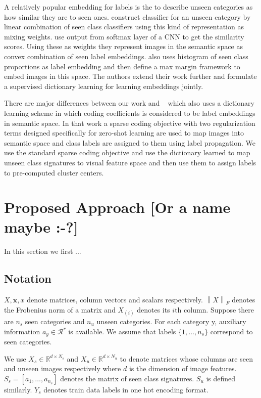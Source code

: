 \documentclass[wcp]{jmlr}
\newcommand{\norm}[1]{\left \lVert #1 \right \rVert_{F}}
\begin{document}
A relatively popular embedding for labels is the to describe unseen categories as how similar they are to seen ones.
\cite{costa} construct  classifier for an unseen category by linear combination of seen class classifiers
using this kind of representation as mixing weights. \cite{convex} use output from softmax layer of a CNN to get the similarity scores.
Using these as weights they represent images in the semantic space as convex combination of seen label embeddings.
\cite{sse} also uses histogram of seen class proportions as label embedding and then define a max margin framework to embed images
 in this space. The authors extend their work further \cite{agnostic} and formulate a supervised dictionary learning
 for learning embeddings jointly.


There are major differences between our work and  ~\cite{Kodirov2015} which also uses a dictionary learning scheme in which coding coefficients is considered to be
 label embeddings in semantic space. In that work a sparse coding objective with two regularization terms designed specifically for
 zero-shot learning are used to map images into semantic space and class labels are assigned to them using label propagation. We use
 the standard sparse coding objective and use the dictionary learned to map unseen class signatures to visual feature space and then
 use them to assign labels to pre-computed cluster centers.

\section{Proposed Approach [Or a name maybe :-?]}
In this section we first ...


\subsection{Notation}
$X, \mathbf{x}, x$ denote matrices, column vectors and scalars respectively. $\norm{X}$ denotes the Frobenius norm of a matrix and
$X_{(i)}$ denotes its $i$th column.
Suppose there are $n_s$ seen categories and $n_u$ unseen categories. For each category y,
auxiliary information $a_y \in \mathcal{R}^r$ is available. We assume that labels $\{1, \ldots, n_s \}$
correspond to seen categories.

We use $X_s \in \mathbb{R}^{d \times N_s}$ and $X_u \in \mathbb{R}^{d \times N_u}$
to denote matrices whose columns are seen and unseen images respectively where $d$ is the dimension of image features.
$S_s = [a_1, \ldots, a_{n_s}]$ denotes the matrix of seen class signatures. $S_u$ is defined similarly. $Y_s$
denotes train data labels in one hot encoding format.
\end{document}
